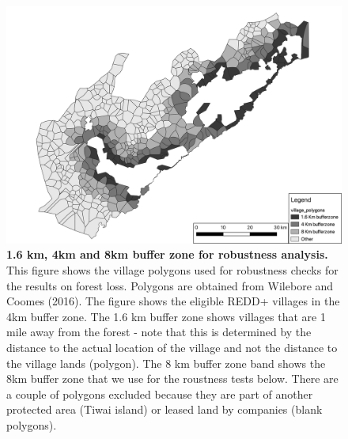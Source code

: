 \documentclass[
]{article}
\begin{document}
\begin{figure}[H]

{\centering \includegraphics[width=0.9\linewidth]{3_maps/village_polygons_alt_1mile} 

}

\caption{\textbf{1.6 km, 4km and 8km buffer zone for robustness analysis.} This figure shows the village polygons used for robustness checks for the results on forest loss. Polygons are obtained from Wilebore and Coomes (2016). The figure shows the eligible REDD+ villages in the 4km buffer zone. The 1.6 km buffer zone shows villages that are 1 mile away from the forest - note that this is determined by the distance to the actual location of the village and not the distance to the village lands (polygon). The 8 km buffer zone band shows the 8km buffer zone that we use for the roustness tests below. There are a couple of polygons excluded because they are part of another protected area (Tiwai island) or leased land by companies (blank polygons).}\label{fig:figPolygonsRobust}
\end{figure}
\end{document}
